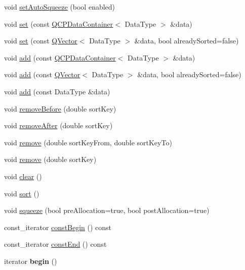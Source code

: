 \begin{DoxyCompactItemize}
\item 
void \hyperlink{class_q_c_p_data_container_a233f866760a78950d2a393c1a4bc54b5}{set\+Auto\+Squeeze} (bool enabled)
\item 
void \hyperlink{class_q_c_p_data_container_ae7042bd534fc3ce7befa2ce3f790b5bf}{set} (const \hyperlink{class_q_c_p_data_container}{Q\+C\+P\+Data\+Container}$<$ Data\+Type $>$ \&data)
\item 
void \hyperlink{class_q_c_p_data_container_aff99fffbb26597a354c4bc8312596ab2}{set} (const \hyperlink{class_q_vector}{Q\+Vector}$<$ Data\+Type $>$ \&data, bool already\+Sorted=false)
\item 
void \hyperlink{class_q_c_p_data_container_a42b98bd994307ccd163a43d576f91ad9}{add} (const \hyperlink{class_q_c_p_data_container}{Q\+C\+P\+Data\+Container}$<$ Data\+Type $>$ \&data)
\item 
void \hyperlink{class_q_c_p_data_container_a51d2a4c9ce4baf5e950b767d26673972}{add} (const \hyperlink{class_q_vector}{Q\+Vector}$<$ Data\+Type $>$ \&data, bool already\+Sorted=false)
\item 
void \hyperlink{class_q_c_p_data_container_a715e8e9972466804954a2f8fbd5288b7}{add} (const Data\+Type \&data)
\item 
void \hyperlink{class_q_c_p_data_container_aa7f74cbce304b0369e1626c3798e1eda}{remove\+Before} (double sort\+Key)
\item 
void \hyperlink{class_q_c_p_data_container_abbe5d87ffc10b5aeffa5bb42cf03aa3c}{remove\+After} (double sort\+Key)
\item 
void \hyperlink{class_q_c_p_data_container_ae5f569a120648b167efa78835f12fd38}{remove} (double sort\+Key\+From, double sort\+Key\+To)
\item 
void \hyperlink{class_q_c_p_data_container_a2dbded7f0732bacf9db48fdfbbb620bc}{remove} (double sort\+Key)
\item 
void \hyperlink{class_q_c_p_data_container_a7e2b29736c6fd761649bda1a54ba967f}{clear} ()
\item 
void \hyperlink{class_q_c_p_data_container_a75da92e33063b63d6da5014683591d45}{sort} ()
\item 
void \hyperlink{class_q_c_p_data_container_a82fcc511def22287fc62579d0706387c}{squeeze} (bool pre\+Allocation=true, bool post\+Allocation=true)
\item 
const\+\_\+iterator \hyperlink{class_q_c_p_data_container_a02360beeb3484df7c20f20c8f3ed4bb2}{const\+Begin} () const 
\item 
const\+\_\+iterator \hyperlink{class_q_c_p_data_container_ad007d9955a4fb2ec1f7e07532b59d169}{const\+End} () const 
\item 
iterator {\bfseries begin} ()\hypertarget{class_q_c_p_data_container_a58c6f18e40003df1759ef571b485d720}{}\label{class_q_c_p_data_container_a58c6f18e40003df1759ef571b485d720}


\end{DoxyCompactItemize}
